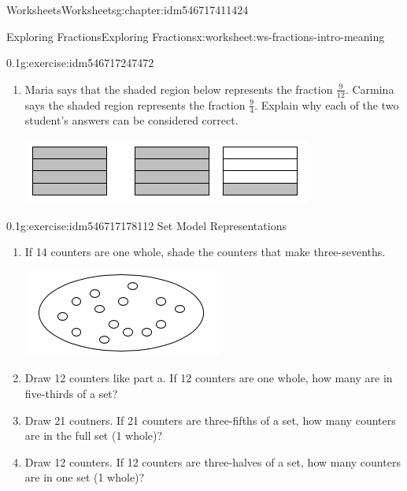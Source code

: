 \documentclass[twoside,11pt,]{book}
\begin{document}
\begin{chapterptx}{Worksheets}{}{Worksheets}{}{}{g:chapter:idm546717411424}
\begin{worksheet-section-numberless}{Exploring Fractions}{}{Exploring Fractions}{}{}{x:worksheet:ws-fractions-intro-meaning}
\begin{divisionexercise}{1}{}{0.1}{g:exercise:idm546717247472}
\begin{enumerate}[label=(\alph*)]
\item{}Maria says that the shaded region below represents the fraction \(\frac{9}{12} \). Carmina says the shaded region represents the fraction \(\frac{9}{4} \). Explain why each of the two student’s answers can be considered correct. \begin{sidebyside}{1}{0.25}{0.25}{0}%
\begin{sbspanel}{0.5}%
\includegraphics[width=1\linewidth]{images/nine-fourths-vs-twelfths.png}
\end{sbspanel}%
\end{sidebyside}%
%
\end{enumerate}
\end{divisionexercise}%
\begin{divisionexercise}{2}{}{0.1}{g:exercise:idm546717178112}%
Set Model Representations%
%
\begin{enumerate}[label=(\alph*)]
\item{}If 14 counters are one whole, shade the counters that make three-sevenths. \begin{sidebyside}{1}{0.35}{0.35}{0}%
\begin{sbspanel}{0.3}%
\includegraphics[width=1\linewidth]{images/fourteen-counters.png}
\end{sbspanel}%
\end{sidebyside}%
%
\item{}Draw 12 counters like part a. If 12 counters are one whole, how many are in five-thirds of a set?%
\item{}Draw 21 coutners. If 21 counters are three-fifths of a set, how many counters are in the full set (1 whole)?%
\item{}Draw 12 counters. If 12 counters are three-halves of a set, how many counters are in one set (1 whole)?%

\end{enumerate}
\end{divisionexercise}
\end{worksheet-section-numberless}
\end{chapterptx}
\end{document}
